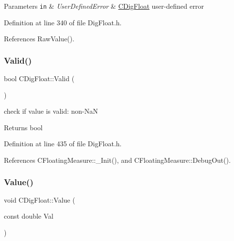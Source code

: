 \begin{DoxyParams}[1]{Parameters}
\mbox{\tt in}  & {\em User\+Defined\+Error} & \hyperlink{classCDigFloat}{C\+Dig\+Float} user-\/defined error \\
\hline
\end{DoxyParams}


Definition at line 340 of file Dig\+Float.\+h.



References Raw\+Value().

\mbox{\label{classCDigFloat_aab339f7e1ffa5c88f3dbb432389752c9}} 
\subsubsection{\texorpdfstring{Valid()}{Valid()}}
{\footnotesize\ttfamily bool C\+Dig\+Float\+::\+Valid (\begin{DoxyParamCaption}{ }\end{DoxyParamCaption})\hspace{0.3cm}{\ttfamily [inline]}}



check if value is valid\+: non-\/\+NaN 

\begin{DoxyReturn}{Returns}
bool 
\end{DoxyReturn}


Definition at line 435 of file Dig\+Float.\+h.



References C\+Floating\+Measure\+::\+\_\+\+Init(), and C\+Floating\+Measure\+::\+Debug\+Out().

\mbox{\label{classCDigFloat_af74b8cd0935294b6371f551b7a1ff640}} 
\subsubsection{\texorpdfstring{Value()}{Value()}\hspace{0.1cm}{\footnotesize\ttfamily [1/2]}}
{\footnotesize\ttfamily void C\+Dig\+Float\+::\+Value (\begin{DoxyParamCaption}\item[{const double}]{Val }\end{DoxyParamCaption})}



